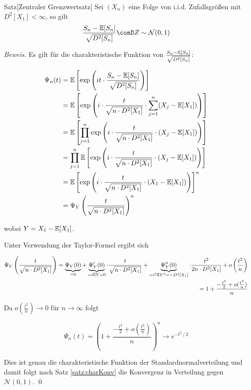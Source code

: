 \begin{colbox}{Satz}[Zentraler Grenzwertsatz]\label{satz:zentralerGWS}
    Sei $(X_n)$ eine Folge von i.i.d. Zufallsgrößen mit $D^2[X_1]<\infty$, so gilt 
    \[
        \dfrac{S_n-\E[S_n]}{\sqrt{D^2[S_n]}} \conD Z \sim \mathcal{N}(0,1)
    \]
\end{colbox}
\textit{Beweis.} 
Es gilt für die charakteristische Funktion von $\tfrac{S_n-\mathbb E[S_n]}{\sqrt{D^2[S_n]}}$:

\begin{align*}
    \Psi_n(t) 
    &= \mathbb E\left[\exp\left(it\cdot \dfrac{S_n-\mathbb E[S_n]}{\sqrt{D^2[S_n]}}\right)\right] \\
    &= \mathbb E\left[\exp\left(i\cdot \dfrac{t}{\sqrt{n\cdot D^2[X_1]}}\cdot\sum_{j=1}^{n}(X_j-\mathbb E[X_1])\right)\right] \\
    &= \mathbb E\left[\prod_{j=1}^{n}\exp\left(i\cdot \dfrac{t}{\sqrt{n\cdot D^2[X_1]}}\cdot(X_j-\mathbb E[X_1])\right)\right] \\
    &= \prod_{j=1}^{n}\mathbb E\left[\exp\left(i\cdot \dfrac{t}{\sqrt{n\cdot D^2[X_1]}}\cdot(X_j-\mathbb E[X_1])\right)\right]\\
    &= \mathbb E\left[\exp\left(i\cdot \dfrac{t}{\sqrt{n\cdot D^2[X_1]}}\cdot(X_1-\mathbb E[X_1])\right)\right]^n \\
    &= \Psi_Y\left(\dfrac{t}{\sqrt{n\cdot D^2[X_1]}}\right)^n
\end{align*}

wobei $Y=X_1-\mathbb E[X_1]$. 

Unter Verwendung der Taylor-Formel ergibt sich

\begin{align*}
    \Psi_Y\left(\dfrac{t}{\sqrt{n\cdot D^2[X_1]}}\right) 
    = \underbrace{\Psi_Y(0)}_{=0} + \underbrace{\Psi_Y'(0)}_{=i\mathbb E Y = 0}\cdot \dfrac{t}{\sqrt{n\cdot D^2[X_1]}} 
    + \underbrace{\Psi_Y''(0)}_{=i^2\mathbb E Y^2 = -D^2[X_1]}\cdot \dfrac{t^2}{2n\cdot D^2[X_1]} 
    + o\left(\dfrac{t^2}{n}\right) \\
    = 1 + \dfrac{-\tfrac{t^2}{2}+o(\tfrac{t^2}{n})}{n}
\end{align*}

Da $o(\tfrac{t^2}{n})\to 0$ für $n\to\infty$ folgt 

\[
    \Psi_n(t) = \left( 1 + \dfrac{-\tfrac{t^2}{2}+o(\tfrac{t^2}{n})}{n}\right)^n \to e^{-t^2\,/\,2}
\]

Dies ist genau die charakteristische Funktion der Standardnormalverteilung und damit folgt nach Satz \ref{satz:charKonv}
die Konvergenz in Verteilung gegen $\mathcal{N}(0,1)$.
\qed

